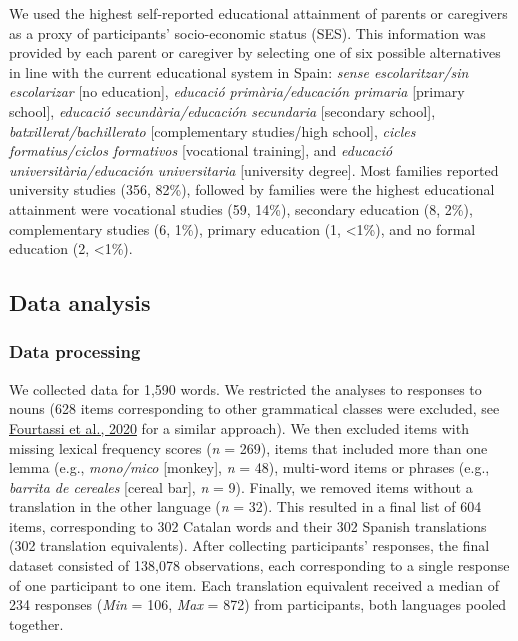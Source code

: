 \documentclass[
]{article}
\begin{document}
We used the highest self-reported educational attainment of parents or
caregivers as a proxy of participants' socio-economic status (SES). This
information was provided by each parent or caregiver by selecting one of
six possible alternatives in line with the current educational system in
Spain: \emph{sense escolaritzar/sin escolarizar} {[}no education{]},
\emph{educació primària/educación primaria} {[}primary school{]},
\emph{educació secundària/educación secundaria} {[}secondary school{]},
\emph{batxillerat/bachillerato} {[}complementary studies/high school{]},
\emph{cicles formatius/ciclos formativos} {[}vocational training{]}, and
\emph{educació universitària/educación universitaria} {[}university
degree{]}. Most families reported university studies (356, 82\%),
followed by families were the highest educational attainment were
vocational studies (59, 14\%), secondary education (8, 2\%),
complementary studies (6, 1\%), primary education (1, \textless1\%), and
no formal education (2, \textless1\%).

\hypertarget{sec-analysis}{%
\subsection{Data analysis}\label{sec-analysis}}

\hypertarget{data-processing}{%
\subsubsection{Data processing}\label{data-processing}}

We collected data for 1,590 words. We restricted the analyses to
responses to nouns (628 items corresponding to other grammatical classes
were excluded, see \protect\hyperlink{ref-fourtassi2020growth}{Fourtassi
et al., 2020} for a similar approach). We then excluded items with
missing lexical frequency scores (\emph{n} = 269), items that included
more than one lemma (e.g., \emph{mono/mico} {[}monkey{]}, \emph{n} =
48), multi-word items or phrases (e.g., \emph{barrita de cereales}
{[}cereal bar{]}, \emph{n} = 9). Finally, we removed items without a
translation in the other language (\emph{n} = 32). This resulted in a
final list of 604 items, corresponding to 302 Catalan words and their
302 Spanish translations (302 translation equivalents). After collecting
participants' responses, the final dataset consisted of 138,078
observations, each corresponding to a single response of one participant
to one item. Each translation equivalent received a median of 234
responses (\emph{Min} = 106, \emph{Max} = 872) from participants, both
languages pooled together.
\end{document}
